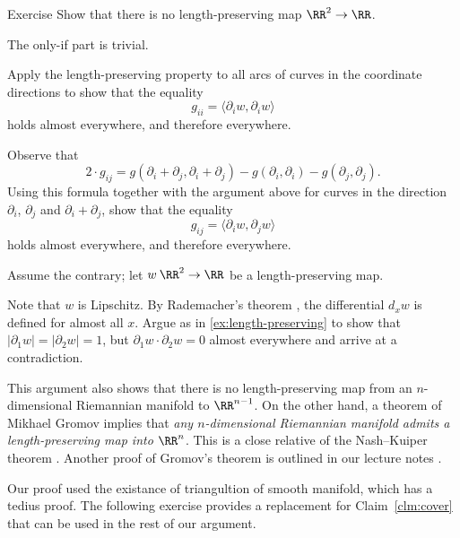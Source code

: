 \begin{thm}{Exercise}\label{ex:R2->R}
Show that there is no length-preserving map $\RR^2\to\RR$.
\end{thm}








 The only-if part is trivial.

Apply the length-preserving property to all arcs of curves in the coordinate directions to show that the equality
\[g_{ii}=\langle \partial_i w, \partial_i w\rangle\]
holds almost everywhere, and therefore everywhere.

Observe that
\[2\cdot g_{ij}=g(\partial_i+\partial_j,\partial_i+\partial_j)-g(\partial_i,\partial_i)-g(\partial_j,\partial_j).\]
Using this formula together with the argument above for curves in the direction $\partial_i$, $\partial_j$ and $\partial_i+\partial_j$, show that the equality
\[g_{ij}=\langle \partial_i w, \partial_j w\rangle\]
holds almost everywhere, and therefore everywhere.

 Assume the contrary;
let $w\:\RR^2\to \RR$ be a length-preserving map.

Note that $w$ is Lipschitz.
By Rademacher's theorem \cite{rademacher}, the differential $d_xw$ is defined for  almost all $x$.
Argue as in \ref{ex:length-preserving} to show that $|\partial_1w|=|\partial_2w|=1$, but $\partial_1w\cdot \partial_2w=0$ almost everywhere and arrive at a contradiction.

 This argument also shows that there is no length-preserving map from an $n$-dimensional Riemannian manifold to $\RR^{n-1}$.
On the other hand, a theorem of Mikhael Gromov \cite[Section~2.4.11]{gromov-1986} implies that \textit{any $n$-dimensional Riemannian manifold admits a length-preserving map into $\RR^n$}.
This is a close relative of the Nash--Kuiper theorem \cite{nash-1954,kuiper-1955}.
Another proof of Gromov's theorem is outlined in our lecture notes \cite{petrunin-yashinski}.















Our proof used the existance of triangultion of smooth manifold, which has a tedius proof.
The following exercise provides a replacement for Claim~\ref{clm:cover} that can be used in the rest of our argument.

